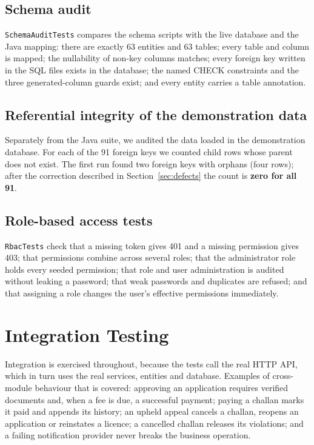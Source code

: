 \subsection{Schema audit}\label{sec:schemaaudit}
\texttt{SchemaAuditTests} compares the schema scripts with the live database and the Java
mapping: there are exactly 63 entities and 63 tables; every table and column is mapped;
the nullability of non-key columns matches; every foreign key written in the SQL files
exists in the database; the named CHECK constraints and the three generated-column guards
exist; and every entity carries a table annotation.

\subsection{Referential integrity of the demonstration data}
Separately from the Java suite, we audited the data loaded in the demonstration database. For
each of the 91 foreign keys we counted child rows whose parent does not exist. The first
run found two foreign keys with orphans (four rows); after the correction described in
Section~\ref{sec:defects} the count is \textbf{zero for all 91}.

\subsection{Role-based access tests}\label{sec:rbactest}
\texttt{RbacTests} check that a missing token gives 401 and a missing permission gives 403;
that permissions combine across several roles; that the administrator role holds every
seeded permission; that role and user administration is audited without leaking a
password; that weak passwords and duplicates are refused; and that assigning a role
changes the user's effective permissions immediately.

\section{Integration Testing}
Integration is exercised throughout, because the tests call the real HTTP API, which in
turn uses the real services, entities and database. Examples of cross-module behaviour
that is covered: approving an application requires verified documents and, when a fee is
due, a successful payment; paying a challan marks it paid and appends its history; an
upheld appeal cancels a challan, reopens an application or reinstates a licence; a
cancelled challan releases its violations; and a failing notification provider never
breaks the business operation.

